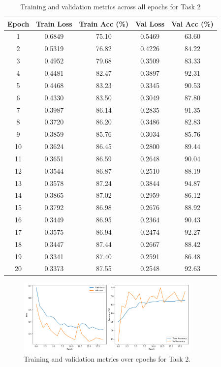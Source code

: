 \documentclass[11pt,a4paper]{article}
\begin{document}
\begin{table}[H]
    \centering
    \caption{Training and validation metrics across all epochs for Task 2}
    \label{tab:training_metrics}
    \begin{tabular}{ccccc}
    \toprule
    \textbf{Epoch} & \textbf{Train Loss} & \textbf{Train Acc (\%)} & \textbf{Val Loss} & \textbf{Val Acc (\%)} \\
    \midrule
    1 & 0.6849 & 75.10 & 0.5469 & 63.60 \\
    2 & 0.5319 & 76.82 & 0.4226 & 84.22 \\
    3 & 0.4952 & 79.68 & 0.3509 & 83.33 \\
    4 & 0.4481 & 82.47 & 0.3897 & 92.31 \\
    5 & 0.4468 & 83.23 & 0.3345 & 90.53 \\
    6 & 0.4330 & 83.50 & 0.3049 & 87.80 \\
    7 & 0.3987 & 86.14 & 0.2835 & 91.35 \\
    8 & 0.3720 & 86.20 & 0.3486 & 82.83 \\
    9 & 0.3859 & 85.76 & 0.3034 & 85.76 \\
    10 & 0.3624 & 86.45 & 0.2800 & 89.44 \\
    11 & 0.3651 & 86.59 & 0.2648 & 90.04 \\
    12 & 0.3544 & 86.87 & 0.2510 & 88.19 \\
    13 & 0.3578 & 87.24 & 0.3844 & 94.87 \\
    14 & 0.3865 & 87.02 & 0.2959 & 86.12 \\
    15 & 0.3792 & 86.98 & 0.2676 & 88.92 \\
    16 & 0.3449 & 86.95 & 0.2364 & 90.43 \\
    17 & 0.3575 & 86.94 & 0.2474 & 92.27 \\
    18 & 0.3447 & 87.44 & 0.2667 & 88.42 \\
    19 & 0.3341 & 87.40 & 0.2591 & 86.48 \\
    20 & 0.3373 & 87.55 & 0.2548 & 92.63 \\
    \bottomrule
    \end{tabular}
\end{table}

\begin{figure}[H]
    \centering
    \includegraphics[width=0.8\textwidth]{../Task2/results/training_history.png}
    \caption{Training and validation metrics over epochs for Task 2.}
    \label{fig:training_history}
\end{figure}
\end{document}
